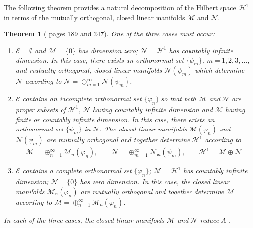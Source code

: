 \documentclass[11pt]{amsart}
\newcommand{\Hc}{\mathcal{H}}
\newcommand{\Ec}{\mathcal{E}}
\renewcommand{\Mc}{\mathcal{M}}
\newcommand{\Nc}{\mathcal{N}}
\newtheorem{theorem}{Theorem}[section]
\begin{document}
The following theorem provides a natural decomposition of the Hilbert
space $\Hc^1$ in terms of the mutually orthogonal, closed linear manifolds
$\Mc$ and $\Nc$.
%
\begin{theorem}[\cite{Stone:64} pages 189 and 247]
\label{thm:Hilbert_Eig_Decomp}  
One of the three cases must occur:
%
\begin{enumerate}
\item $\Ec=\emptyset$ and $\Mc=\{0\}$ has dimension zero; $\Nc=\Hc^1$
has countably infinite dimension. In this case, there exists an
orthonormal set $\{\psi_m\}$, $m=1,2,3,\ldots$, and mutually orthogonal, closed
linear manifolds $\Nc(\psi_m)$ which determine $\Nc$ according to
$\Nc=\oplus_{m=1}^\infty\Nc(\psi_m)$.   
\item $\Ec$ contains an incomplete orthonormal set $\{\varphi_n\}$ so that
both $\Mc$ and $\Nc$ are proper subsets of $\Hc^1$, $\Nc$ having
countably infinite dimension and $\Mc$ having finite or countably
infinite dimension. In this case, there exists an orthonormal set
$\{\psi_m\}$ in $\Nc$. The closed linear manifolds $\Mc(\varphi_n)$ and
$\Nc(\psi_m)$ are mutually orthogonal and together determine $\Hc^1$
according to   
%
\begin{align*}
  \Mc=\oplus_{n=1}^\infty\Mc_n(\varphi_n), \qquad
  \Nc=\oplus_{m=1}^\infty\Nc_m(\psi_m), \qquad
  \Hc^1=\Mc\oplus\Nc
\end{align*}
%
\item $\Ec$ contains a complete orthonormal set $\{\varphi_n\}$; $\Mc=\Hc^1$
has countably infinite dimension; $\Nc=\{0\}$ has zero dimension. In
this case, the closed linear manifolds $\Mc_n(\varphi_n)$ are mutually
orthogonal and together determine $\Mc$ according 
to $\Mc=\oplus_{n=1}^\infty\Mc_n(\varphi_n)$.     
\end{enumerate}
%
In each of the three cases, the closed linear manifolds $\Mc$ and
$\Nc$ reduce $A$ \cite{Stone:64}.
\end{theorem}
\end{document}
